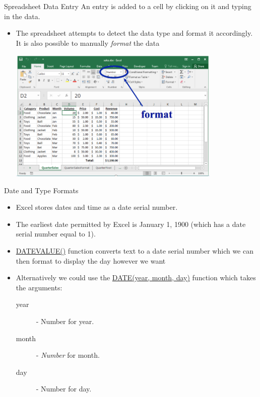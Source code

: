 \documentclass[xcolor=svgnames]{beamer}
\begin{document}
\begin{frame}{Spreadsheet Data Entry}
An entry is added to a cell by clicking on it and typing in the data.  
\begin{itemize}
\item The spreadsheet attempts to detect the data type and format it
accordingly. It is also possible to manually \emph{format} the data
\begin{center}
 \includegraphics[width=0.8\textwidth]{CellFormat.png}
\end{center}                                         
\end{itemize}
\end{frame}



\begin{frame}{Date and Type Formats}
\begin{itemize}
\item Excel stores dates and time as a date serial number.\medskip
\item The earliest date permitted by Excel is  January 1, 1900 (which has a date serial number equal to 1).
\medskip
\item \href{https://support.office.com/en-us/article/datevalue-function-df8b07d4-7761-4a93-bc33-b7471bbff252}{DATEVALUE()} function converts text to a date serial number which we can then format to display the day however we want
\medskip
\item Alternatively we could use the \href{https://exceljet.net/excel-functions/excel-date-function}{DATE(year, month, day)} function which takes the arguments:
\begin{description}
\item[year] - Number for year.
\item[month] - \textit{Number} for month.
\item[day] - Number for day.
\end{description}
\end{itemize}
\end{frame}
\end{document}
